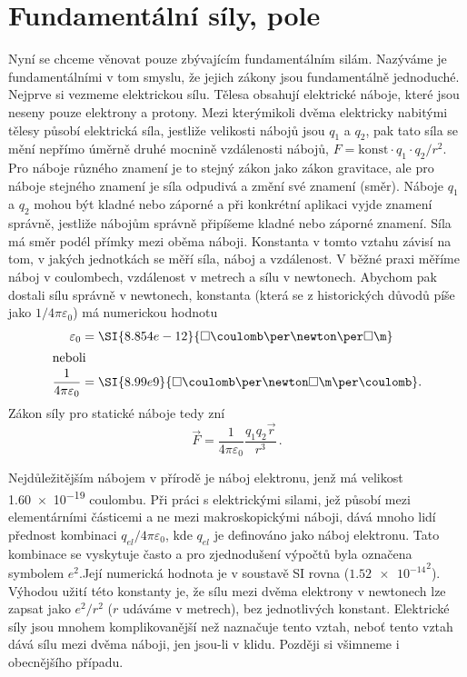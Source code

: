   \section{Fundamentální síly, pole}\label{fyz:IchapXIIsecIV}
    Nyní se chceme věnovat pouze zbývajícím fundamentálním silám. Nazýváme je fundamentálními v tom 
    smyslu, že jejich zákony jsou fundamentálně jednoduché. Nejprve si vezmeme elektrickou sílu. 
    Tělesa obsahují elektrické náboje, které jsou neseny pouze elektrony a protony. Mezi 
    kterýmikoli dvěma elektricky nabitými tělesy působí elektrická síla, jestliže velikosti nábojů 
    jsou \(q_1\) a \(q_2\), pak tato síla se mění nepřímo úměrně druhé mocnině vzdálenosti nábojů, 
    \(F=\text{konst}\cdot q_1\cdot q_2/r^2\). Pro náboje různého znamení je to stejný zákon jako 
    zákon gravitace, ale pro náboje stejného znamení je síla odpudivá a změní své znamení (směr). 
    Náboje \(q_1\) a \(q_2\) mohou být kladné nebo záporné a při konkrétní aplikaci vyjde znamení 
    správně, jestliže nábojům správně připíšeme kladné nebo záporné znamení. Síla má směr podél 
    přímky mezi oběma náboji. Konstanta v tomto vztahu závisí na tom, v jakých jednotkách se měří 
    síla, náboj a vzdálenost. V běžné praxi měříme náboj v coulombech, vzdálenost v metrech a sílu 
    v newtonech. Abychom pak dostali sílu správně v newtonech, konstanta (která se z historických 
    důvodů píše jako \(1/4\pi\varepsilon_0\)) má numerickou hodnotu
    \begin{subequations}
    \label{fyz:eq170}
      \begin{align}
        \varepsilon_0 
          &= \SI{8.854e-12}{\square\coulomb\per\newton\per\square\m}          \label{fyz:eq170a} \\
        \shortintertext{neboli}
        \frac{1}{4\pi\varepsilon_0} 
          &= \SI{8.99e9}{\square\coulomb\per\newton\square\m\per\coulomb}.    \label{fyz:eq170b}
      \end{align}
    \end{subequations}
    Zákon síly pro statické náboje tedy zní
    \begin{equation}\label{fyz:eq171}
      \boxed{\vec{F} = \frac{1}{4\pi\varepsilon_0}\frac{q_1q_2\vec{r}}{r^3}}\,. 
    \end{equation}
    
    Nejdůležitějším nábojem v přírodě je náboj elektronu, jenž má velikost \num{1.60e-19} coulombu. 
    Při práci s elektrickými silami, jež působí mezi elementárními částicemi a ne mezi 
    makroskopickými náboji, dává mnoho lidí přednost kombinaci \(q_{el}/4\pi\varepsilon_0\), kde 
    \(q_{el}\) je definováno jako náboj elektronu. Tato kombinace se vyskytuje často a pro 
    zjednodušení výpočtů byla označena symbolem \(e^2\).Její numerická hodnota je v soustavě SI 
    rovna (\(\num{1.52e-14}^2\)). Výhodou užití této konstanty je, že sílu mezi dvěma elektrony v 
    newtonech lze zapsat jako \(e^2/r^2\) (\(r\) udáváme v metrech), bez jednotlivých konstant. 
    Elektrické síly jsou mnohem komplikovanější než naznačuje tento vztah, neboť tento vztah dává 
    sílu mezi dvěma náboji, jen jsou-li v klidu. Později si všimneme i obecnějšího případu.
  
